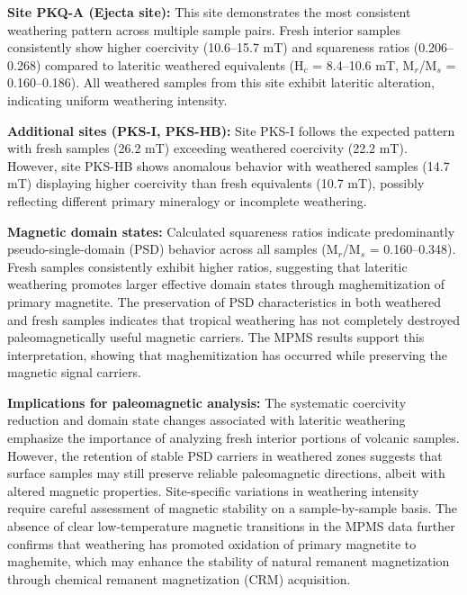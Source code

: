 \documentclass[twocolumn,11pt]{article}
\begin{document}
\textbf{Site PKQ-A (Ejecta site):} This site demonstrates the most consistent weathering pattern across multiple sample pairs. Fresh interior samples consistently show higher coercivity (10.6--15.7 mT) and squareness ratios (0.206--0.268) compared to lateritic weathered equivalents (H$_c$ = 8.4--10.6 mT, M$_r$/M$_s$ = 0.160--0.186). All weathered samples from this site exhibit lateritic alteration, indicating uniform weathering intensity.

\textbf{Additional sites (PKS-I, PKS-HB):} Site PKS-I follows the expected pattern with fresh samples (26.2 mT) exceeding weathered coercivity (22.2 mT). However, site PKS-HB shows anomalous behavior with weathered samples (14.7 mT) displaying higher coercivity than fresh equivalents (10.7 mT), possibly reflecting different primary mineralogy or incomplete weathering.

\textbf{Magnetic domain states:} Calculated squareness ratios indicate predominantly pseudo-single-domain (PSD) behavior across all samples (M$_r$/M$_s$ = 0.160--0.348). Fresh samples consistently exhibit higher ratios, suggesting that lateritic weathering promotes larger effective domain states through maghemitization of primary magnetite. The preservation of PSD characteristics in both weathered and fresh samples indicates that tropical weathering has not completely destroyed paleomagnetically useful magnetic carriers. The MPMS results support this interpretation, showing that maghemitization has occurred while preserving the magnetic signal carriers.

\textbf{Implications for paleomagnetic analysis:} The systematic coercivity reduction and domain state changes associated with lateritic weathering emphasize the importance of analyzing fresh interior portions of volcanic samples. However, the retention of stable PSD carriers in weathered zones suggests that surface samples may still preserve reliable paleomagnetic directions, albeit with altered magnetic properties. Site-specific variations in weathering intensity require careful assessment of magnetic stability on a sample-by-sample basis. The absence of clear low-temperature magnetic transitions in the MPMS data further confirms that weathering has promoted oxidation of primary magnetite to maghemite, which may enhance the stability of natural remanent magnetization through chemical remanent magnetization (CRM) acquisition.
\end{document}
